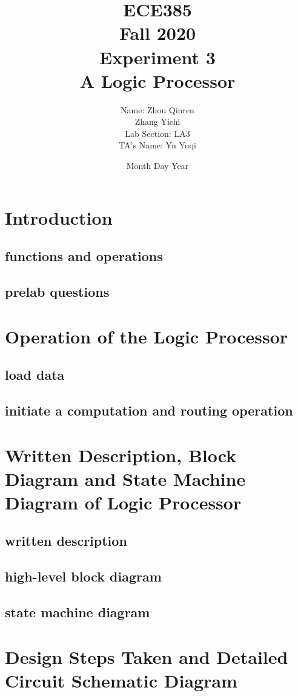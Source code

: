 \documentclass[12pt]{article}
\title{
    \textbf{\Huge ECE385} \\
    \huge Fall 2020 \\
    \huge Experiment 3 \\[120pt]
    \textbf{\Huge A Logic Processor} \\[120pt]
    }
\author{
    \large Name: Zhou Qinren \\ 
            \quad\qquad Zhang Yichi \\
    \large Lab Section: LA3 \\
    \large TA's Name: Yu Yuqi
    }
\date{Month Day Year}
\begin{document}
\setlength{\parindent}{0pt}
\maketitle
\newpage

\section{Introduction}
\subsection{functions and operations}

\subsection{pre­lab questions}


\section{Operation of the Logic Processor}
\subsection{load data}

\subsection{initiate a computation and routing operation}


\section{Written Description, Block Diagram and State Machine Diagram of Logic Processor}
\subsection{written description}

\subsection{high-level block diagram}

\subsection{state machine diagram}


\section{Design Steps Taken and Detailed Circuit Schematic Diagram}
\end{document}
